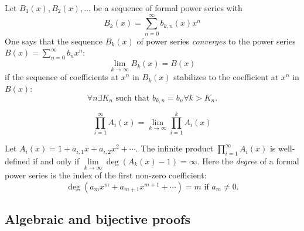 \begin{page}
\setcounter{section}{3}
\setcounter{subsection}{4}
\setcounter{dfn}{7}
\label{portion:803}

\begin{dfn}
Let $B_1(x), B_2(x), \ldots$ be a sequence of formal power series with
\[
B_k(x) = \sum_{n=0}^\infty b_{k,n}(x) x^n
\]
One says that the sequence $B_k(x)$ of power series \emph{converges} to the power series $B(x) = \sum_{n=0}^\infty b_n x^n$:
\[
\lim_{k \to \infty} B_k(x) = B(x)
\]
if the sequence of coefficients at $x^n$ in $B_k(x)$ stabilizes to the coefficient at $x^n$ in $B(x)$:
\[
\forall n \exists K_n \text{ such that } b_{k,n} = b_n \forall k > K_n.
\]
\end{dfn}

\end{page}

\begin{page}
\setcounter{section}{3}
\setcounter{subsection}{4}
\setcounter{dfn}{8}
\label{portion:806}

\begin{dfn}
\[
\prod_{i=1}^\infty A_i(x) = \lim_{k \to \infty} \prod_{i=1}^k A_i(x)
\]
\end{dfn}

\end{page}

\begin{page}
\setcounter{section}{3}
\setcounter{subsection}{4}
\setcounter{dfn}{9}
\label{portion:809}

\begin{lem}
Let $A_i(x) = 1 + a_{i,1} x + a_{i,2} x^2 + \cdots$.
The infinite product $\prod_{i=1}^\infty A_i(x)$ is well-defined if and only if $\lim\limits_{k \to \infty} \deg (A_k(x) - 1) = \infty$.
Here the \emph{degree} of a formal power series is the index of the first non-zero coefficient:
\[
\deg (a_m x^m + a_{m+1} x^{m+1} + \cdots) = m \text{ if } a_m \ne 0.
\]
\end{lem}

\end{page}

\begin{page}
\setcounter{section}{3}
\setcounter{subsection}{5}
\setcounter{dfn}{9}
\label{portion:811}

\subsection{Algebraic and bijective proofs}

% 

\end{page}

